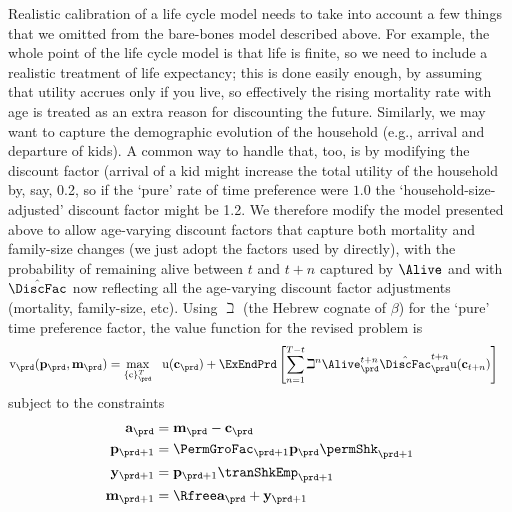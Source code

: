 \documentclass[titlepage, headings=optiontotocandhead]{econtex}
\begin{document}
Realistic calibration of a life cycle model needs to take into account a few things that we omitted from the bare-bones model described above. For example, the whole point of the life cycle model is that life is finite, so we need to include a realistic treatment of life expectancy; this is done easily enough, by assuming that utility accrues only if you live, so effectively the rising mortality rate with age is treated as an extra reason for discounting the future.  Similarly, we may want to capture the demographic evolution of the household (e.g., arrival and departure of kids).  A common way to handle that, too, is by modifying the discount factor (arrival of a kid might increase the total utility of the household by, say, 0.2, so if the `pure' rate of time preference were $1.0$ the `household-size-adjusted' discount factor might be 1.2.  We therefore modify the model presented above to allow age-varying discount factors that capture both mortality and family-size changes (we just adopt the factors used by \cite{cagettiWprofiles} directly), with the probability of remaining alive between $t$ and $t+n$ captured by $\Alive$ and with $\hat{\DiscFac}$ now reflecting all the age-varying discount factor adjustments (mortality, family-size, etc).  Using $\beth$ (the Hebrew cognate of $\beta$) for the `pure' time preference factor, the value function for the revised problem is
  \begin{equation}\begin{gathered}\begin{aligned}
        \mathrm{v}_{\prd}(\mathbf{p}_{\prd},\mathbf{m}_{\prd}) & =    \max_{\{\mathrm{c}\}_{\prd}^{T}}~~ \mathrm{u}(\mathbf{c}_{\prd})+\ExEndPrd\left[\sum_{n=1}^{T-t}\beth^{n} \Alive_{\prd}^{t+n}\hat{\DiscFac}_{\prd}^{t+n} \mathrm{u}(\mathbf{c}_{t+n}) \right]   \label{eq:lifecyclemax}
      \end{aligned}\end{gathered}  \end{equation}
subject to the constraints
  \begin{equation*}\begin{gathered}\begin{aligned}
        \mathbf{a}_{\prd}  & = \mathbf{m}_{\prd}-\mathbf{c}_{\prd}
        \\      \mathbf{p}_{\prd+1}  & = \PermGroFac_{\prd+1}\mathbf{p}_{\prd}\permShk_{\prd+1}
        \\      \mathbf{y}_{\prd+1}  & = \mathbf{p}_{\prd+1}\tranShkEmp _{\prd+1}
        \\      \mathbf{m}_{\prd+1}  & = \Rfree \mathbf{a}_{\prd}+\mathbf{y}_{\prd+1}
      \end{aligned}\end{gathered}\end{equation*}
\end{document}
